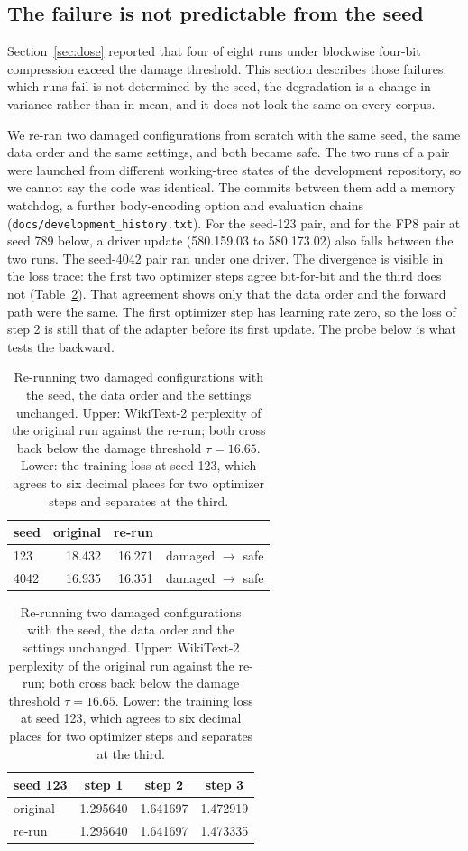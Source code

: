 \documentclass[11pt,letterpaper]{article}
\begin{document}
\subsection{The failure is not predictable from the seed}
\label{sec:lottery}

Section~\ref{sec:dose} reported that four of eight runs under blockwise four-bit compression exceed the damage threshold. This section describes those failures: which runs fail is not determined by the seed, the degradation is a change in variance rather than in mean, and it does not look the same on every corpus.

\medskip
We re-ran two damaged configurations from scratch with the same seed, the same data order and the same settings, and both became safe. The two runs of a pair were launched from different working-tree states of the development repository, so we cannot say the code was identical. The commits between them add a memory watchdog, a further body-encoding option and evaluation chains (\texttt{docs/development\_history.txt}). For the seed-123 pair, and for the FP8 pair at seed 789 below, a driver update (580.159.03 to 580.173.02) also falls between the two runs. The seed-4042 pair ran under one driver. The divergence is visible in the loss trace: the first two optimizer steps agree bit-for-bit and the third does not (Table~\ref{tab:rerun}). That agreement shows only that the data order and the forward path were the same. The first optimizer step has learning rate zero, so the loss of step 2 is still that of the adapter before its first update. The probe below is what tests the backward.

\begin{table}[htbp]
\centering
\small
\caption{Re-running two damaged configurations with the seed, the data order and the settings unchanged. Upper: WikiText-2 perplexity of the original run against the re-run; both cross back below the damage threshold $\tau = 16.65$. Lower: the training loss at seed 123, which agrees to six decimal places for two optimizer steps and separates at the third.}
\label{tab:rerun}
\begin{tabular}{lrrl}
\toprule
seed & original & re-run & \\
\midrule
123  & 18.432 & 16.271 & damaged $\rightarrow$ safe \\
4042 & 16.935 & 16.351 & damaged $\rightarrow$ safe \\
\bottomrule
\end{tabular}

\vspace{0.8\baselineskip}

\begin{tabular}{lccc}
\toprule
seed 123 & step 1 & step 2 & step 3 \\
\midrule
original & 1.295640 & 1.641697 & 1.472919 \\
re-run   & 1.295640 & 1.641697 & 1.473335 \\
\bottomrule
\end{tabular}
\end{table}
\end{document}
